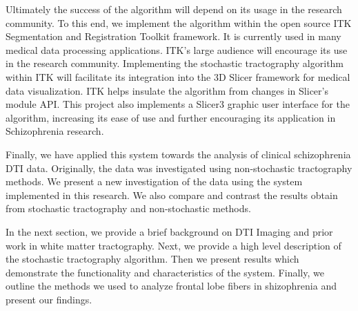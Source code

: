 Ultimately the success of the algorithm will depend on its usage in the research community.  To this end, we implement the algorithm within the open source ITK Segmentation and Registration Toolkit \cite{itk} framework.  It is currently used in many medical data processing applications.  ITK's large audience will encourage its use in the research community.  Implementing the stochastic tractography algorithm within ITK will facilitate its integration into the 3D Slicer framework \cite{3Dslicer} for medical data visualization.  ITK helps insulate the algorithm from changes in Slicer's module API.  This project also implements a Slicer3 graphic user interface for the algorithm, increasing its ease of use and further encouraging its application in Schizophrenia research.

Finally, we have applied this system towards the analysis of clinical schizophrenia DTI data.  Originally, the data was investigated using non-stochastic tractography methods.  We present a new investigation of the data using the system implemented in this research.  We also compare and contrast the results obtain from stochastic tractography and non-stochastic methods.

In the next section, we provide a brief background on DTI Imaging and prior work in white matter tractography.  Next, we provide a high level description of the stochastic tractography algorithm.  Then we present results which demonstrate the functionality and characteristics of the system.  Finally, we outline the methods we used to analyze frontal lobe fibers in shizophrenia and present our findings.


